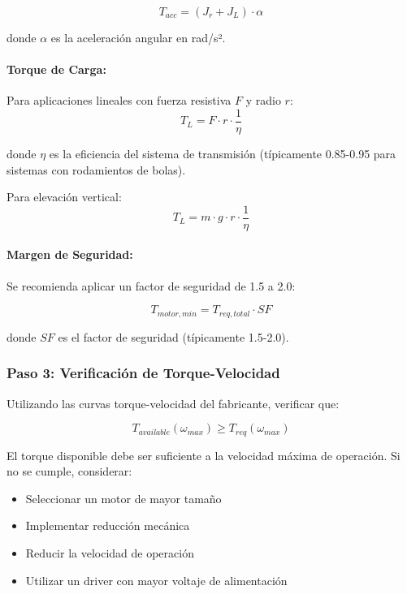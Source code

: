 \begin{equation}
T_{acc} = (J_r + J_L) \cdot \alpha
\end{equation}

donde $\alpha$ es la aceleración angular en rad/s².

\paragraph{Torque de Carga:}

Para aplicaciones lineales con fuerza resistiva $F$ y radio $r$:
\begin{equation}
T_L = F \cdot r \cdot \frac{1}{\eta}
\end{equation}

donde $\eta$ es la eficiencia del sistema de transmisión (típicamente 0.85-0.95 para sistemas con rodamientos de bolas).

Para elevación vertical:
\begin{equation}
T_L = m \cdot g \cdot r \cdot \frac{1}{\eta}
\end{equation}

\paragraph{Margen de Seguridad:}

Se recomienda aplicar un factor de seguridad de 1.5 a 2.0:

\begin{equation}
T_{motor,min} = T_{req,total} \cdot SF
\end{equation}

donde $SF$ es el factor de seguridad (típicamente 1.5-2.0).

\subsubsection{Paso 3: Verificación de Torque-Velocidad}

Utilizando las curvas torque-velocidad del fabricante, verificar que:

\begin{equation}
T_{available}(\omega_{max}) \geq T_{req}(\omega_{max})
\end{equation}

El torque disponible debe ser suficiente a la velocidad máxima de operación. Si no se cumple, considerar:

\begin{itemize}
    \item Seleccionar un motor de mayor tamaño
    \item Implementar reducción mecánica
    \item Reducir la velocidad de operación
    \item Utilizar un driver con mayor voltaje de alimentación
\end{itemize}


